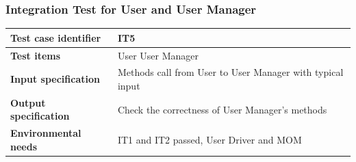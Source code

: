 \documentclass{article}
\begin{document}
			\subsubsection{Integration Test for User and User Manager} \label{sec:3.1.3}
				\begin{minipage}{\linewidth}
				\end{minipage}
				\begin{center}
					\setlength{\tabcolsep}{24pt}
					\renewcommand{\arraystretch}{1.4}
					\begin{tabular}{ | l | p{8cm} |}\hline
						\textbf{Test case identifier} & IT5\\\hline
						\textbf{Test items} & User \textrightarrow User Manager\\\hline
						\textbf{Input specification} & Methods call from User to User Manager with typical input \\\hline
						\textbf{Output specification} & Check the correctness of User Manager's methods \\\hline
						\textbf{Environmental needs} & IT1 and IT2 passed, User Driver and MOM \\\hline
					\end{tabular}
				\end{center}
				\pagebreak
\end{document}
